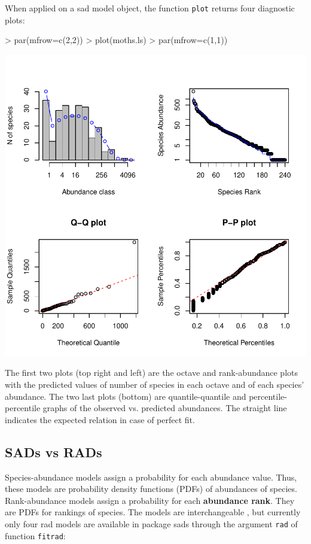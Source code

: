 \documentclass[11pt, A4]{article}
\newcommand{\code}[1]{\texttt{#1}}
\begin{document}
When applied on a sad model object, the function \code{plot} returns four diagnostic plots:
\begin{Schunk}
\begin{Sinput}
> par(mfrow=c(2,2))
> plot(moths.ls)
> par(mfrow=c(1,1))
\end{Sinput}
\end{Schunk}
\includegraphics{sads_intro-woven-Plot-of-predicted-values}


The first two plots (top right and left) are the octave and rank-abundance plots with the predicted values 
of number of species in each octave 
and of each species' abundance. The two last plots (bottom) are quantile-quantile and percentile-percentile graphs of 
the observed vs. predicted abundances. The straight line indicates the expected relation in case of perfect fit.

\subsection{SADs vs RADs}

Species-abundance models assign a probability for each abundance
value. Thus, these models are probability density functions (PDFs) of
abundances of species. 
Rank-abundance models assign a probability for each
\textbf{abundance rank}. They are PDFs for rankings of species. The models are
interchangeable \citep{May1975}, but currently only four rad models
are available in package sads through the argument \code{rad} of
function \code{fitrad}:
\end{document}
